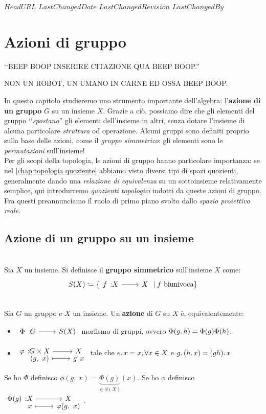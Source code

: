 \svnidlong
{$HeadURL$}
{$LastChangedDate$}
{$LastChangedRevision$}
{$LastChangedBy$}

\chapter{Azioni di gruppo}

\begin{introduction}
‘‘BEEP BOOP INSERIRE CITAZIONE QUA BEEP BOOP.''
\begin{flushright}
	\textsc{NON UN ROBOT,} UN UMANO IN CARNE ED OSSA BEEP BOOP.
\end{flushright}
\end{introduction}
\noindent In questo capitolo studieremo uno strumento importante dell'algebra: l'\textbf{azione di un gruppo} $G$ su un insieme $X$. Grazie a ciò, possiamo dire che gli elementi del gruppo ‘‘\textit{spostano}'' gli elementi dell'insieme in altri, senza dotare l'insieme di alcuna particolare \textit{struttura} od operazione. Alcuni gruppi sono definiti proprio sulla base delle azioni, come il \textit{gruppo simmetrico}: gli elementi sono le \textit{permutazioni} sull'insieme!\\
Per gli scopi della topologia, le azioni di gruppo hanno particolare importanza: se nel \autoref{chap:topologia quoziente} abbiamo visto diversi tipi di spazi quozienti, generalmente dando una \textit{relazione di equivalenza} su un sottoinsieme relativamente semplice, qui introdurremo \textit{quozienti topologici} indotti da queste azioni di gruppo. Fra questi preannunciamo il ruolo di primo piano svolto dallo \textit{spazio proiettivo reale}.
\section{Azione di un gruppo su un insieme}
\begin{define}~{}\\
	Sia $X$ un insieme. Si definisce il \textbf{gruppo simmetrico} sull'insieme $X$ come:
	\begin{equation}
		S(X)\coloneqq \{\funz f X X \mid f \text{ biunivoca}\}
	\end{equation}
\vspace{-6mm}
\end{define}
\begin{define}~{}\\
	Sia $G$ un gruppo e $X$ un insieme. Un'\textbf{azione} di $G$ su $X$ è, equivalentemente:
		\begin{itemize}
			\item  $\funz \Phi G {S(X)}$ morfismo di gruppi, ovvero $\Phi(g\ldotp h)=\Phi(g)\Phi(h)$.
			\item $\funztot \phi {G\times X} X {(g,\ x)} {g\ldotp x}$ tale che $e\ldotp x=x, \forall x\in X$ e $g\ldotp (h\ldotp x)=(gh)\ldotp x$.
		\end{itemize}
	Se ho $\Phi$ definisco $\phi(g,\ x)=\underbrace{\Phi(g)}_{\in S(X)}(x)$.\newline
	Se ho $\phi$ definisco $\funztot {\Phi(g)} X X x {\phi(g,\ x)}$.
\end{define}

